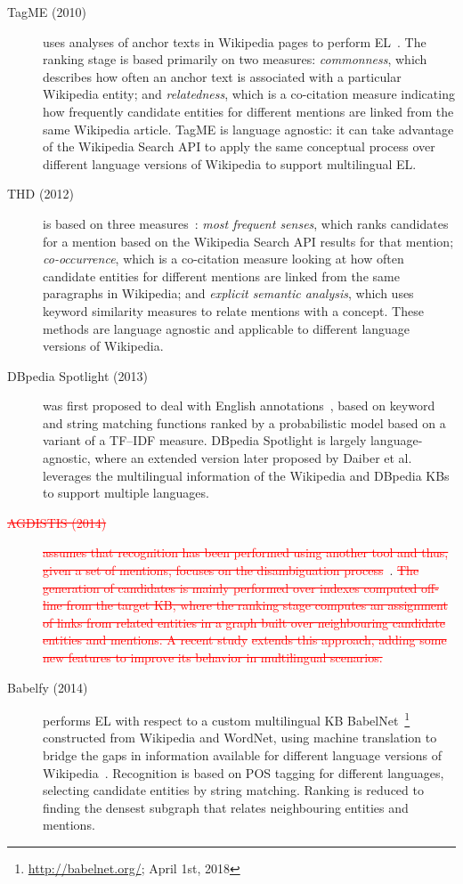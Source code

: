 \documentclass{llncs}
\begin{document}
\begin{description}
\item[TagME (2010)] uses analyses of anchor texts in Wikipedia pages to perform EL~\cite{ferragina2010tagme}. The ranking stage is based primarily on two measures: \textit{commonness}, which describes how often an anchor text is associated with a particular Wikipedia entity; and \textit{relatedness}, which is a co-citation measure indicating how frequently candidate entities for different mentions are linked from the same Wikipedia article. TagME is language agnostic: it can take advantage of the Wikipedia Search API to apply the same conceptual process over different language versions of Wikipedia to support multilingual EL.
\item[THD (2012)] is based on three measures~\cite{THD-dojchinovski2012recognizing}: \textit{most frequent senses}, which ranks candidates for a mention based on the Wikipedia Search API results for that mention; \textit{co-occurrence}, which is a co-citation measure looking at how often candidate entities for different mentions are linked from the same paragraphs in Wikipedia; and \textit{explicit semantic analysis}, which uses keyword similarity measures to relate mentions with a concept. These methods are language agnostic and applicable to different language versions of Wikipedia.
\item[DBpedia Spotlight (2013)] was first proposed to deal with English annotations~\cite{mendes2011dbpedia}, based on keyword and string matching functions ranked by a probabilistic model based on a variant of a TF--IDF measure. DBpedia Spotlight is largely language-agnostic, where an extended version later proposed by Daiber et al.~\cite{daiber2013improving} leverages the multilingual information of the Wikipedia and DBpedia KBs to support multiple languages.
\item[\textcolor{red}{\st{AGDISTIS (2014)}}] \textcolor{red}{\st{assumes that recognition has been performed using another tool and thus, given a set of mentions, focuses on the disambiguation process}}~\cite{usbeck2014agdistis}. \textcolor{red}{\st{The generation of candidates is mainly performed over indexes computed off-line from the target KB, where the ranking stage computes an assignment of links from related entities in a graph built over neighbouring candidate entities and mentions. A recent study}} \cite{mag2017} \textcolor{red}{\st{extends this approach, adding some new features to improve its behavior in multilingual scenarios.}} 
\item[Babelfy (2014)] performs EL with respect to a custom multilingual KB BabelNet~\footnote{\url{http://babelnet.org/}; April 1st, 2018} constructed from Wikipedia and WordNet, using machine translation to bridge the gaps in information available for different language versions of Wikipedia~\cite{Babelfy-moro2014entity}. Recognition is based on POS tagging for different languages, selecting candidate entities by string matching. Ranking is reduced to finding the densest subgraph that relates neighbouring entities and mentions.

\end{description}
\end{document}
